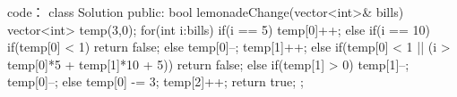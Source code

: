 code：
class Solution {
public:
    bool lemonadeChange(vector<int>& bills) {
        vector<int> temp(3,0);
        for(int i:bills)
        {
            if(i == 5) temp[0]++;
            else if(i == 10)
            {
                if(temp[0] < 1) return false;
                else temp[0]--;
                temp[1]++;
            }
            else
            {
                if(temp[0] < 1 || (i > temp[0]*5 + temp[1]*10 + 5)) return false;
                else
                {
                    if(temp[1] > 0)
                    {
                        temp[1]--; temp[0]--;
                    }
                    else temp[0] -= 3;
                    temp[2]++;
                }
            }
        }
        return true;
    }
};